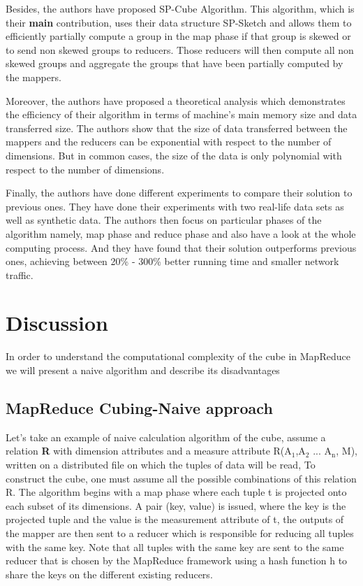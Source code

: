 \documentclass[10pt,journal,compsoc]{IEEEtran}
\begin{document}
Besides, the authors have proposed SP-Cube Algorithm. This algorithm, which is their \textbf{main} contribution, uses their data structure SP-Sketch and allows them to efficiently partially compute a group in the map phase if that group is skewed or to send non skewed groups to reducers. Those reducers will then compute all non skewed groups and aggregate the groups that have been partially computed by the mappers.

Moreover, the authors have proposed a theoretical analysis which demonstrates the efficiency of their algorithm in terms of machine's main memory size and data transferred size. The authors show that the size of data transferred between the mappers and the reducers can be exponential with respect to the number of dimensions. But in common cases, the size of the data is only polynomial with respect to the number of dimensions.

Finally, the authors have done different experiments to compare their solution to previous ones. They have done their experiments with two real-life data sets as well as synthetic data. The authors then focus on particular phases of the algorithm namely, map phase and reduce phase and also have a look at the whole computing process. And they have found that their solution outperforms previous ones, achieving between 20\% - 300\% better running time and smaller network traffic. 


\section{Discussion}\label{sec:discussion}
In order to understand the computational complexity of the cube in MapReduce we will present a naive algorithm and describe its disadvantages

\subsection{MapReduce Cubing-Naive approach }

Let's take an example of naive calculation algorithm of the cube, assume a relation \textbf{R} with dimension attributes and a measure attribute R($\textrm{A}_\textrm{1}$,$\textrm{A}_\textrm{2}$ ... $\textrm{A}_\textrm{n}$, M), written on a distributed file on which the tuples of data will be read, To construct the cube, one must assume all the possible combinations of this relation R. The algorithm begins with a map phase where each tuple t is projected onto each subset of its dimensions. A pair (key, value) is issued, where the key is the projected tuple and the value is the measurement attribute of t, the outputs of the mapper are then sent to a reducer which is responsible for reducing all tuples with the same key. Note that all tuples with the same key are sent to the same reducer that is chosen by the MapReduce framework using a hash function h to share the keys on the different existing reducers.
\end{document}
